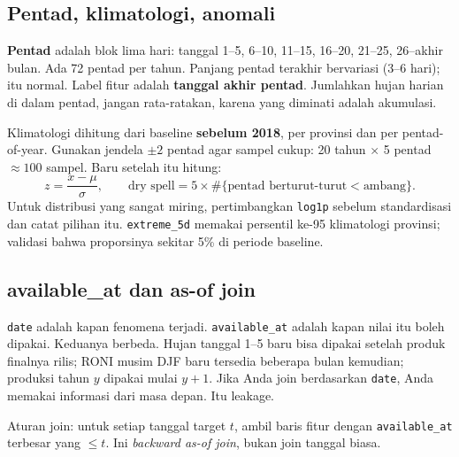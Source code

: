 \documentclass[9pt,a4paper]{extarticle}
\newcommand{\code}[1]{\texttt{\small\color{ink}#1}}
\begin{document}
\subsection{Pentad, klimatologi, anomali}

\textbf{Pentad} adalah blok lima hari: tanggal 1--5, 6--10, 11--15, 16--20, 21--25, 26--akhir bulan. Ada 72 pentad per tahun. Panjang pentad terakhir bervariasi (3--6 hari); itu normal. Label fitur adalah \textbf{tanggal akhir pentad}. Jumlahkan hujan harian di dalam pentad, jangan rata-ratakan, karena yang diminati adalah akumulasi.

Klimatologi dihitung dari baseline \textbf{sebelum 2018}, per provinsi dan per pentad-of-year. Gunakan jendela $\pm2$ pentad agar sampel cukup: 20 tahun $\times$ 5 pentad $\approx100$ sampel. Baru setelah itu hitung:
\[
z = \frac{x-\mu}{\sigma},\qquad
\text{dry spell} = 5 \times \#\{\text{pentad berturut-turut} < \text{ambang}\}.
\]
Untuk distribusi yang sangat miring, pertimbangkan \code{log1p} sebelum standardisasi dan catat pilihan itu. \code{extreme\_5d} memakai persentil ke-95 klimatologi provinsi; validasi bahwa proporsinya sekitar 5\% di periode baseline.

\subsection{available\_at dan as-of join}

\code{date} adalah kapan fenomena terjadi. \code{available\_at} adalah kapan nilai itu boleh dipakai. Keduanya berbeda. Hujan tanggal 1--5 baru bisa dipakai setelah produk finalnya rilis; RONI musim DJF baru tersedia beberapa bulan kemudian; produksi tahun $y$ dipakai mulai $y+1$. Jika Anda join berdasarkan \code{date}, Anda memakai informasi dari masa depan. Itu leakage.

Aturan join: untuk setiap tanggal target $t$, ambil baris fitur dengan \code{available\_at} terbesar yang $\le t$. Ini \emph{backward as-of join}, bukan join tanggal biasa.
\end{document}
